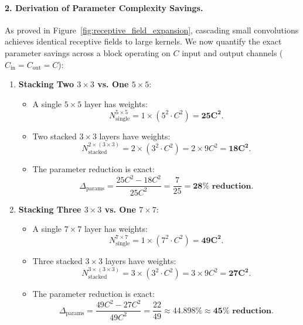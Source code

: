 \paragraph{2. Derivation of Parameter Complexity Savings.}
As proved in Figure~\ref{fig:receptive_field_expansion}, cascading small convolutions achieves identical receptive fields to large kernels. We now quantify the exact parameter savings across a block operating on $C$ input and output channels ($C_{\text{in}} = C_{\text{out}} = C$):
\begin{enumerate}[leftmargin=*]
  \item \textbf{Stacking Two $3 \times 3$ vs. One $5 \times 5$}:
    \begin{itemize}[noitemsep]
      \item A single $5 \times 5$ layer has weights:
        \begin{equation}
        N_{\text{single}}^{5\times 5} = 1 \times \left( 5^2 \cdot C^2 \right) = \mathbf{25 C^2}.
        \end{equation}
      \item Two stacked $3 \times 3$ layers have weights:
        \begin{equation}
        N_{\text{stacked}}^{2 \times (3\times 3)} = 2 \times \left( 3^2 \cdot C^2 \right) = 2 \times 9 C^2 = \mathbf{18 C^2}.
        \end{equation}
      \item The parameter reduction is exact:
        \begin{equation}
        \Delta_{\text{params}} = \frac{25 C^2 - 18 C^2}{25 C^2} = \frac{7}{25} = \mathbf{28\% \text{ reduction}}.
        \label{eq:vgg_savings_28}
        \end{equation}
    \end{itemize}
  
  \item \textbf{Stacking Three $3 \times 3$ vs. One $7 \times 7$}:
    \begin{itemize}[noitemsep]
      \item A single $7 \times 7$ layer has weights:
        \begin{equation}
        N_{\text{single}}^{7\times 7} = 1 \times \left( 7^2 \cdot C^2 \right) = \mathbf{49 C^2}.
        \end{equation}
      \item Three stacked $3 \times 3$ layers have weights:
        \begin{equation}
        N_{\text{stacked}}^{3 \times (3\times 3)} = 3 \times \left( 3^2 \cdot C^2 \right) = 3 \times 9 C^2 = \mathbf{27 C^2}.
        \end{equation}
      \item The parameter reduction is exact:
        \begin{equation}
        \Delta_{\text{params}} = \frac{49 C^2 - 27 C^2}{49 C^2} = \frac{22}{49} \approx \mathbf{44.898\% \approx 45\% \text{ reduction}}.
        \label{eq:vgg_savings_45}
        \end{equation}
    \end{itemize}
\end{enumerate}

